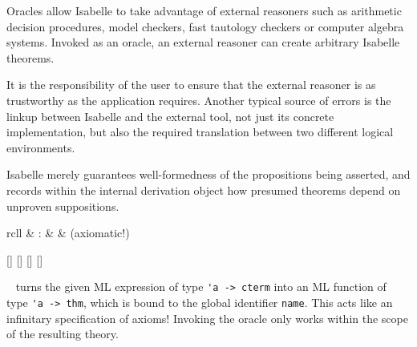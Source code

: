 \begin{isabellebody}
\begin{isamarkuptext}
\begin{description}
  \end{description}%
\end{isamarkuptext}%
\isamarkuptrue%
%
\isamarkuptrue%
%
\begin{isamarkuptext}%
Oracles allow Isabelle to take advantage of external reasoners
  such as arithmetic decision procedures, model checkers, fast
  tautology checkers or computer algebra systems.  Invoked as an
  oracle, an external reasoner can create arbitrary Isabelle theorems.

  It is the responsibility of the user to ensure that the external
  reasoner is as trustworthy as the application requires.  Another
  typical source of errors is the linkup between Isabelle and the
  external tool, not just its concrete implementation, but also the
  required translation between two different logical environments.

  Isabelle merely guarantees well-formedness of the propositions being
  asserted, and records within the internal derivation object how
  presumed theorems depend on unproven suppositions.

  \begin{matharray}{rcll}
    \hypertarget{command.oracle}{\hyperlink{command.oracle}{\mbox{}}} & : &  & (axiomatic!) \\
  \end{matharray}

  \begin{railoutput}
[]
[]
[]
[]
\rail@end
\end{railoutput}


  \begin{description}

  \item \hyperlink{command.oracle}{\mbox{}}~ turns the given ML
  expression  of type \verb|'a -> cterm| into an
  ML function of type \verb|'a -> thm|, which is bound to the
  global identifier \verb|name|.  This acts like an infinitary
  specification of axioms!  Invoking the oracle only works within the
  scope of the resulting theory.


\end{description}
\end{isamarkuptext}
\end{isabellebody}
